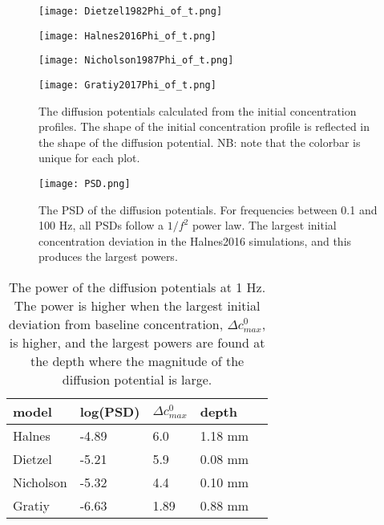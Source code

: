 \documentclass{article}
\begin{document}
\begin{figure}[!tbp]
  \centering
  \begin{minipage}[b]{0.45\textwidth}
    \texttt{[image: Dietzel1982Phi\_of\_t.png]}
  \end{minipage}
  \hfill
  \begin{minipage}[b]{0.45\textwidth}
    \texttt{[image: Halnes2016Phi\_of\_t.png]}
  \end{minipage}
    \begin{minipage}[b]{0.45\textwidth}
    \texttt{[image: Nicholson1987Phi\_of\_t.png]}
  \end{minipage}
  \hfill
  \begin{minipage}[b]{0.45\textwidth}
    \texttt{[image: Gratiy2017Phi\_of\_t.png]}
  \end{minipage}
  \caption{The diffusion potentials calculated from the initial concentration profiles. The shape of the initial concentration profile is reflected in the shape of the diffusion potential. NB: note that the colorbar is unique for each plot.}
  \label{fig:contours}
\end{figure} 




\begin{figure}
  \texttt{[image: PSD.png]}
  \caption{The PSD of the diffusion potentials. For frequencies between 0.1 and 100 Hz, all PSDs follow a $1/f^2$ power law. The largest initial concentration deviation in the Halnes2016 simulations, and this produces the largest powers.}
  \label{fig:PSD}
\end{figure}




\begin{table}[h!]
  \centering
  \caption{The power of the diffusion potentials at 1 Hz. The power is higher when the largest initial deviation from baseline concentration, $\Delta c^0_{max}$, is higher, and the largest powers are found at the depth where the magnitude of the diffusion potential is large.}
  \label{tab:psd_magnitude}
  \begin{tabular}{l||l|l|l|l}
model & log(PSD) & $\Delta c^0_{max}$ & depth \\
\hline
Halnes & -4.89 & 6.0  & 1.18 mm\\
Dietzel & -5.21 & 5.9 & 0.08 mm \\
Nicholson & -5.32 & 4.4 & 0.10 mm \\
Gratiy &-6.63 & 1.89 & 0.88 mm \\
 \end{tabular}
\end{table}
\end{document}
